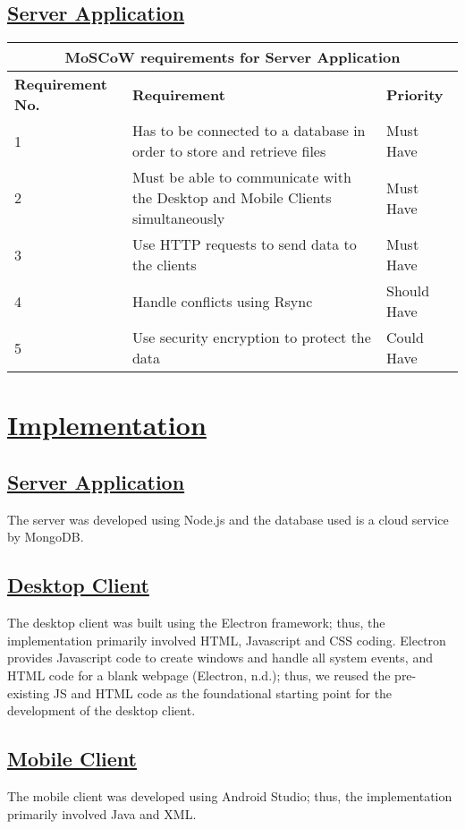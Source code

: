 \documentclass{article}
\begin{document}
\subsection{\underline{Server Application}}

\begin{tabular}{|p{3cm}|p{5cm}|p{4cm}|}
\hline
\multicolumn{3}{|c|}{\textbf{MoSCoW requirements for Server Application}} \\
\hline
\textbf{Requirement No.} & \textbf{Requirement} & \textbf{Priority}\\
\hline
1 & Has to be connected to a database in order to store and retrieve files & Must Have \\
\hline
2 & Must be able to communicate with the Desktop and Mobile Clients simultaneously & Must Have \\
\hline
3 & Use HTTP requests to send data to the clients & Must Have \\
\hline
4 & Handle conflicts using Rsync & Should Have \\
\hline
5 & Use security encryption to protect the data & Could Have\\
\hline
\end{tabular}

\section{\underline{Implementation}}
\subsection{\underline{Server Application}}
The server was developed using Node.js and the database used is a cloud service by MongoDB.

\subsection{\underline{Desktop Client}}
The desktop client was built using the Electron framework; thus, the implementation primarily involved HTML, Javascript and CSS coding. Electron provides Javascript code to create windows and handle all system events, and HTML code for a blank webpage (Electron, n.d.); thus, we reused the pre-existing JS and HTML code as the foundational starting point for the development of the desktop client.

\subsection{\underline{Mobile Client}}
The mobile client was developed using Android Studio; thus, the implementation primarily involved Java and XML.
\end{document}
